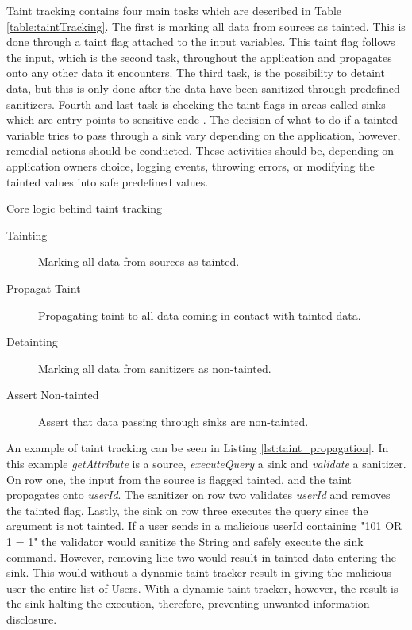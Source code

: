 Taint tracking contains four main tasks which are described in Table \ref{table:taintTracking}. The first is marking all data from sources as tainted. This is done through a taint flag attached to the input variables. This taint flag follows the input, which is the second task, throughout the application and propagates onto any other data it encounters. The third task, is the possibility to detaint data, but this is only done after the data have been sanitized through predefined sanitizers. Fourth and last task is checking the taint flags in areas called sinks which are entry points to sensitive code \parencite{Pan2015, Venkataramani2008}. The decision of what to do if a tainted variable tries to pass through a sink vary depending on the application, however, remedial actions should be conducted. These activities should be, depending on application owners choice, logging events, throwing errors, or modifying the tainted values into safe predefined values. 

\begin{table}[H]
  \centering
  \caption{Core logic behind taint tracking}
  \label{table:taintTracking}
  \begin{description}
    \item [Tainting] Marking all data from sources as tainted.
    \item [Propagat Taint] Propagating taint to all data coming in contact with tainted data.
    \item [Detainting] Marking all data from sanitizers as non-tainted.
    \item [Assert Non-tainted] Assert that data passing through sinks are non-tainted. 
  \end{description}
\end{table}

An example of taint tracking can be seen in Listing \ref{lst:taint_propagation}. In this example \textit{getAttribute} is a source, \textit{executeQuery} a sink and \textit{validate} a sanitizer. On row one, the input from the source is flagged tainted, and the taint propagates onto \textit{userId}. The sanitizer on row two validates \textit{userId} and removes the tainted flag. Lastly, the sink on row three executes the query since the argument is not tainted. If a user sends in a malicious userId containing "101 OR 1 = 1" the validator would sanitize the String and safely execute the sink command. However, removing line two would result in tainted data entering the sink. This would without a dynamic taint tracker result in giving the malicious user the entire list of Users. With a dynamic taint tracker, however, the result is the sink halting the execution, therefore, preventing unwanted information disclosure.

